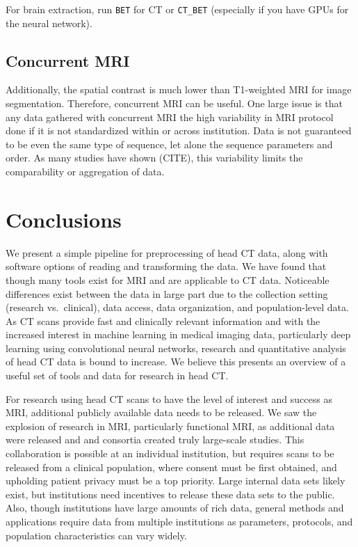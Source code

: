 \documentclass[]{elsarticle} %
\begin{document}
For brain extraction, run \texttt{BET} for CT or \texttt{CT\_BET}
(especially if you have GPUs for the neural network).

\hypertarget{concurrent-mri}{%
\subsection{Concurrent MRI}\label{concurrent-mri}}

Additionally, the spatial contrast is much lower than T1-weighted MRI
for image segmentation. Therefore, concurrent MRI can be useful. One
large issue is that any data gathered with concurrent MRI the high
variability in MRI protocol done if it is not standardized within or
across institution. Data is not guaranteed to be even the same type of
sequence, let alone the sequence parameters and order. As many studies
have shown (CITE), this variability limits the comparability or
aggregation of data.

\hypertarget{conclusions}{%
\section{Conclusions}\label{conclusions}}

We present a simple pipeline for preprocessing of head CT data, along
with software options of reading and transforming the data. We have
found that though many tools exist for MRI and are applicable to CT
data. Noticeable differences exist between the data in large part due to
the collection setting (research vs.~clinical), data access, data
organization, and population-level data. As CT scans provide fast and
clinically relevant information and with the increased interest in
machine learning in medical imaging data, particularly deep learning
using convolutional neural networks, research and quantitative analysis
of head CT data is bound to increase. We believe this presents an
overview of a useful set of tools and data for research in head CT.

For research using head CT scans to have the level of interest and
success as MRI, additional publicly available data needs to be released.
We saw the explosion of research in MRI, particularly functional MRI, as
additional data were released and and consortia created truly
large-scale studies. This collaboration is possible at an individual
institution, but requires scans to be released from a clinical
population, where consent must be first obtained, and upholding patient
privacy must be a top priority. Large internal data sets likely exist,
but institutions need incentives to release these data sets to the
public. Also, though institutions have large amounts of rich data,
general methods and applications require data from multiple institutions
as parameters, protocols, and population characteristics can vary
widely.
\end{document}
